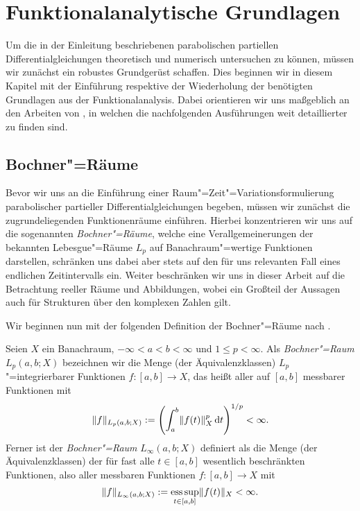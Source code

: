 \documentclass[../main.tex]{subfiles}
\begin{document}
\chapter{Funktionalanalytische Grundlagen} %
\label{chapter:grundlagen}

Um die in der Einleitung beschriebenen parabolischen partiellen Differentialgleichungen theoretisch und numerisch untersuchen zu können, müssen wir zunächst ein robustes Grundgerüst schaffen.
Dies beginnen wir in diesem Kapitel mit der Einführung respektive der Wiederholung der benötigten Grundlagen aus der Funktionalanalysis.
Dabei orientieren wir uns maßgeblich an den Arbeiten von \textcite{Dautray:1992by,Schweizer2013}, in welchen die nachfolgenden Ausführungen weit detaillierter zu finden sind.


\section{Bochner"=Räume} %
\label{section:bochner_raeume}

Bevor wir uns an die Einführung einer Raum"=Zeit"=Variationsformulierung parabolischer partieller Differentialgleichungen begeben, müssen wir zunächst die zugrundeliegenden Funktionenräume einführen.
Hierbei konzentrieren wir uns auf die sogenannten \emph{Bochner"=Räume}, welche eine Verallgemeinerungen der bekannten Lebesgue"=Räume $L_{p}$ auf Banachraum"=wertige Funktionen darstellen, schränken uns dabei aber stets auf den für uns relevanten Fall eines endlichen Zeitintervalls ein.
Weiter beschränken wir uns in dieser Arbeit auf die Betrachtung reeller Räume und Abbildungen, wobei ein Großteil der Aussagen auch für Strukturen über den komplexen Zahlen gilt.

Wir beginnen nun mit der folgenden Definition der Bochner"=Räume nach \cite[Definition XVIII.1.1]{Dautray:1992by}.

\begin{Definition}
\label{definition:bochner_raum}
    Seien $X$ ein Banachraum, $- \infty < a < b < \infty$ und $1 \leq p < \infty$.
    Als \emph{Bochner"=Raum} $L_{p}(a, b; X)$ bezeichnen wir die Menge (der Äquivalenzklassen) $L_{p}$"=integrierbarer Funktionen $f \colon [a, b] \to X$, das heißt aller auf $[a, b]$ messbarer Funktionen mit
    \begin{equation}
        \lVert f\rVert_{L_{p}(a, b; X)} := \left( \int_{a}^{b} \lVert f(t)\rVert_{X}^{p} \mathop{}\!\mathrm{d} t \right)^{1 / p} < \infty.
    \end{equation}
    Ferner ist der \emph{Bochner"=Raum} $L_{\infty}(a, b; X)$ definiert als die Menge (der Äquivalenzklassen) der für fast alle $t \in [a, b]$ wesentlich beschränkten Funktionen, also aller messbaren Funktionen $f \colon [a, b] \to X$ mit
    \begin{equation}
        \lVert f\rVert_{L_{\infty}(a, b; X)} := \operatorname*{ess\,sup}_{t \in [a, b]} \lVert f(t)\rVert_{X} < \infty.
    \end{equation}
\end{Definition}
\end{document}
